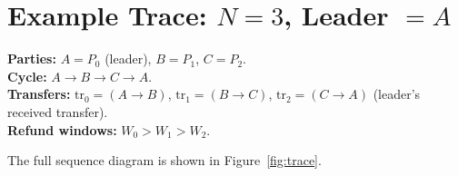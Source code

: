 \documentclass[11pt,a4paper,dvipsnames]{article}
\begin{document}
\section{Example Trace: $N = 3$, Leader $= A$}

\noindent
\textbf{Parties:} $A = P_0$ (leader), $B = P_1$, $C = P_2$.\\
\textbf{Cycle:} $A \to B \to C \to A$.\\
\textbf{Transfers:} $\mathrm{tr}_0 = (A{\to}B)$,\;
  $\mathrm{tr}_1 = (B{\to}C)$,\;
  $\mathrm{tr}_2 = (C{\to}A)$ (leader's received transfer).\\
\textbf{Refund windows:} $W_0 > W_1 > W_2$.

The full sequence diagram is shown in Figure~\ref{fig:trace}.
\end{document}
